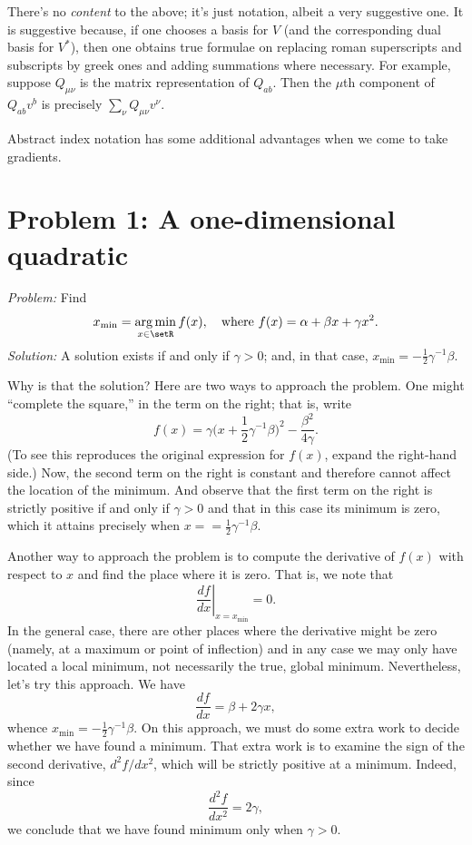 \documentclass[10pt, a4paper]{article}
\DeclareMathOperator*{\argmin}{arg\,min}
\begin{document}
There's no \emph{content} to the above; it's just notation, albeit a
very suggestive one. It is suggestive because, if one chooses a basis
for $V$ (and the corresponding dual basis for $V^*$), then one obtains
true formulae on replacing roman superscripts and subscripts by greek
ones and adding summations where necessary. For example, suppose
$Q_{\mu\nu}$ is the matrix representation of $Q_{ab}$. Then the
$\mu$th component of $Q_{ab}v^b$ is precisely $\sum_\nu Q_{\mu\nu}v^\nu$.

Abstract index notation has some additional advantages when we come to
take gradients.

\section{Problem 1: A one-dimensional quadratic}

\emph{Problem:} Find
\begin{equation}
  x_\text{min} = \argmin_{x\in\setR} f(x), \quad\text{where $f(x) = \alpha + \beta x + \gamma x^2$}.
\label{problem-quadr-one-d}
\end{equation}
\emph{Solution:} A solution exists if and only if $\gamma>0$; and, in
that case, $x_\text{min} = -\frac{1}{2}\gamma^{-1}\beta$.

Why is that the solution? Here are two ways to approach the
problem. One might “complete the square,” in the term on the right;
that is, write
\begin{equation*}
  f(x) = \gamma\bigl(x + \frac{1}{2}\gamma^{-1}\beta\bigr)^2 - \frac{\beta^2}{4\gamma}. 
\end{equation*}
(To see this reproduces the original expression for $f(x)$, expand the
right-hand side.) Now, the second term on the right is constant and
therefore cannot affect the location of the minimum. And observe that
the first term on the right is strictly positive if and only if
$\gamma>0$ and that in this case its minimum is zero, which it attains
precisely when $x = =\frac{1}{2}\gamma^{-1}\beta$.

Another way to approach the problem is to compute the derivative of
$f(x)$ with respect to $x$ and find the place where it is zero. That
is, we note that
\begin{equation*}
  \left.\frac{df}{dx}\right|_{x = x_\text{min}} = 0.
\end{equation*}
In the general case, there are other places where the derivative might
be zero (namely, at a maximum or point of inflection) and in any case
we may only have located a local minimum, not necessarily the true,
global minimum. Nevertheless, let's try this approach. We have
\begin{equation*}
  \frac{df}{dx} = \beta + 2 \gamma x,
\end{equation*}
whence $x_\text{min} = -\frac{1}{2}\gamma^{-1}\beta$. On this approach, we must
do some extra work to decide whether we have found a minimum. That
extra work is to examine the sign of the second derivative, $d^2f/dx^2$,
which will be strictly positive at a minimum. Indeed, since
\begin{equation*}
  \frac{d^2f}{dx^2} = 2\gamma,
\end{equation*}
we conclude that we have found minimum only when $\gamma> 0$.
\end{document}
